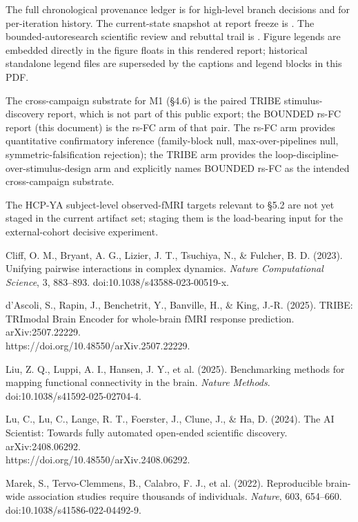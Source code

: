 \documentclass[11pt,letterpaper]{report}
\begin{document}

The full chronological provenance ledger is  for high-level branch decisions and  for per-iteration history. The current-state snapshot at report freeze is . The bounded-autoresearch scientific review and rebuttal trail is . Figure legends are embedded directly in the figure floats in this rendered report; historical standalone legend files are superseded by the captions and legend blocks in this PDF.

The cross-campaign substrate for M1 (\S4.6) is the paired TRIBE stimulus-discovery report, which is not part of this public export; the BOUNDED rs-FC report (this document) is the rs-FC arm of that pair. The rs-FC arm provides quantitative confirmatory inference (family-block null, max-over-pipelines null, symmetric-falsification rejection); the TRIBE arm provides the loop-discipline-over-stimulus-design arm and explicitly names BOUNDED rs-FC as the intended cross-campaign substrate.

The HCP-YA subject-level observed-fMRI targets relevant to \S5.2 are not yet staged in the current artifact set; staging them is the load-bearing input for the external-cohort decisive experiment.



Cliff, O. M., Bryant, A. G., Lizier, J. T., Tsuchiya, N., \& Fulcher, B. D. (2023). Unifying pairwise interactions in complex dynamics. \emph{Nature Computational Science}, 3, 883--893. doi:10.1038/s43588-023-00519-x.

d'Ascoli, S., Rapin, J., Benchetrit, Y., Banville, H., \& King, J.-R. (2025). TRIBE: TRImodal Brain Encoder for whole-brain fMRI response prediction. arXiv:2507.22229. \\ https://doi.org/10.48550/arXiv.2507.22229.

Liu, Z. Q., Luppi, A. I., Hansen, J. Y., et al. (2025). Benchmarking methods for mapping functional connectivity in the brain. \emph{Nature Methods}. doi:10.1038/s41592-025-02704-4.

Lu, C., Lu, C., Lange, R. T., Foerster, J., Clune, J., \& Ha, D. (2024). The AI Scientist: Towards fully automated open-ended scientific discovery. arXiv:2408.06292. \\ https://doi.org/10.48550/arXiv.2408.06292.

Marek, S., Tervo-Clemmens, B., Calabro, F. J., et al. (2022). Reproducible brain-wide association studies require thousands of individuals. \emph{Nature}, 603, 654--660. doi:10.1038/s41586-022-04492-9.
\end{document}
